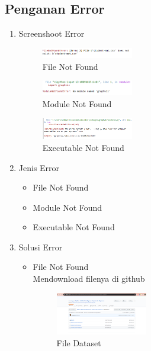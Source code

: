 \subsection{Penganan Error}
\begin{enumerate}
\item Screenshoot Error

\begin{figure}[H]
		\includegraphics[width=4cm]{figures/1174069/2/error/error1.PNG}
		\centering
		\caption{File Not Found}
	\end{figure}
	
	\begin{figure}[H]
		\includegraphics[width=4cm]{figures/1174069/2/error/error2.PNG}
		\centering
		\caption{Module Not Found}
	\end{figure}
	
	\begin{figure}[H]
		\includegraphics[width=4cm]{figures/1174069/2/error/error3.PNG}
		\centering
		\caption{Executable Not Found}
	\end{figure}
	
\item Jenis Error
	\begin{itemize}
	\item File Not Found
	\item Module Not Found
	\item Executable Not Found
	\end{itemize}
	
\item Solusi Error
\begin{itemize}
	\item File Not Found\\
	Mendownload filenya di github
	\begin{figure}[H]
		\includegraphics[width=4cm]{figures/1174069/2/error/solusi1.PNG}
		\centering
		\caption{File Dataset}
	\end{figure}
	

\end{itemize}
\end{enumerate}
